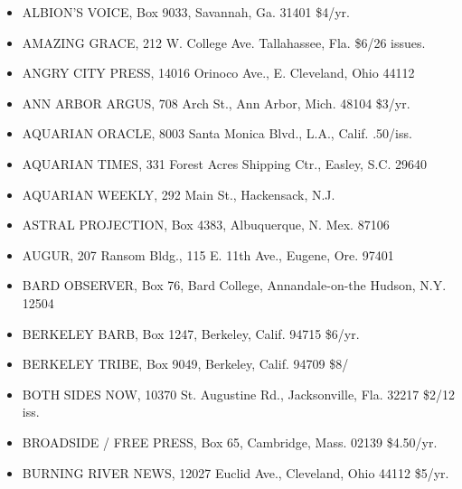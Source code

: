 \documentclass[11pt,twoside,a4paper]{book}
\begin{document}
\begin{minipage}[t]{0.20\textwidth}
\begin{scriptsize}
\begin{itemize}
 	\item[] ALBION'S VOICE, Box 9033, Savannah, Ga. 31401 \$4/yr. 
	\item[] AMAZING GRACE, 212 W. College Ave. Tallahassee, Fla. \$6/26 issues. 
	\item[] ANGRY CITY PRESS, 14016 Orinoco Ave., E. Cleveland, Ohio 44112 
	\item[] ANN ARBOR ARGUS, 708 Arch St., Ann Arbor, Mich. 48104 \$3/yr. 	
	\item[] AQUARIAN ORACLE, 8003 Santa Monica Blvd., L.A., Calif. .50/iss. 
	\item[] AQUARIAN TIMES, 331 Forest Acres Shipping Ctr., Easley, S.C. 29640 
	\item[] AQUARIAN WEEKLY, 292 Main St., Hackensack, N.J. 
	\item[] ASTRAL PROJECTION, Box 4383, Albuquerque, N. Mex. 87106 
	\item[] AUGUR, 207 Ransom Bldg., 115 E. 11th Ave., Eugene, Ore. 97401 
	\item[] BARD OBSERVER, Box 76, Bard College, Annandale-on-the Hudson, N.Y. 12504 
	\item[] BERKELEY BARB, Box 1247, Berkeley, Calif. 94715 \$6/yr. 
	\item[] BERKELEY TRIBE, Box 9049, Berkeley, Calif. 94709 \$8/ 
	\item[] BOTH SIDES NOW, 10370 St. Augustine Rd., Jacksonville, Fla. 32217	\$2/12 iss. 
	\item[] BROADSIDE / FREE PRESS, Box 65, Cambridge, Mass. 02139 \$4.50/yr. 
	\item[] BURNING RIVER NEWS, 12027 Euclid Ave., Cleveland, Ohio 44112 \$5/yr. 
\end{itemize}
\end{scriptsize}
\end{minipage}\hfill
\end{document}
